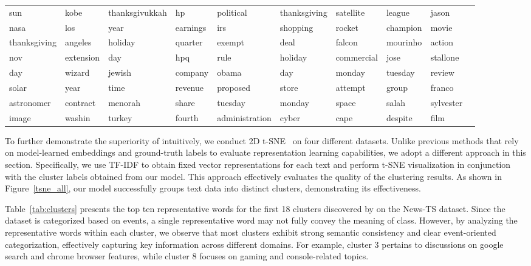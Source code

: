 \begin{table}[htbp]
\begin{tabular}{|l|l|l|l|l|l|l|l|l|l|}
sun	         & kobe	        & thanksgivukkah & hp	     & political	 	 & thanksgiving	 & satellite	 & league		& jason		\\
nasa	     & los	        & year	         & earnings	 & irs	          	 & shopping	     & rocket		 & champion		&movie		\\
thanksgiving	& angeles	 & holiday	     & quarter	 & exempt	         & deal	        & falcon		 & mourinho		&action	\\
nov	       & extension	    & day	        & hpq	     & rule	             & holiday	    & commercial	 & jose		    &stallone	\\
day	       & wizard	       & jewish	        & company	 & obama	      	 & day	       & monday			 & tuesday		& review	\\
solar	   & year	       & time	        & revenue	 & proposed	      	 & store	   & attempt		 & group		& franco	\\
astronomer	 & contract	   & menorah	    & share	     & tuesday	      	 & monday	   & space		     & salah		& sylvester	\\
image	   & washin	       & turkey	        & fourth	 & administration 	 & cyber	   & cape		     & despite		& film	\\
\hline
\end{tabular}
\end{table}

To further demonstrate the superiority of \sysname{} intuitively, we conduct 2D t-SNE~\cite{van2008visualizing} on four different datasets. Unlike previous methods that rely on model-learned embeddings and ground-truth labels to evaluate representation learning capabilities, we adopt a different approach in this section. Specifically, we use TF-IDF to obtain fixed vector representations for each text and perform t-SNE visualization in conjunction with the cluster labels obtained from our model. This approach effectively evaluates the quality of the clustering results. As shown in Figure~\ref{tsne_all}, our model successfully groups text data into distinct clusters, demonstrating its effectiveness.

Table~\ref{tab:clusters} presents the top ten representative words for the first 18 clusters discovered by \sysname{} on the News-TS dataset. Since the dataset is categorized based on events, a single representative word may not fully convey the meaning of class. However, by analyzing the representative words within each cluster, we observe that most clusters exhibit strong semantic consistency and clear event-oriented categorization, effectively capturing key information across different domains. For example, cluster 3 pertains to discussions on google search and chrome browser features, while cluster 8 focuses on gaming and console-related topics.

